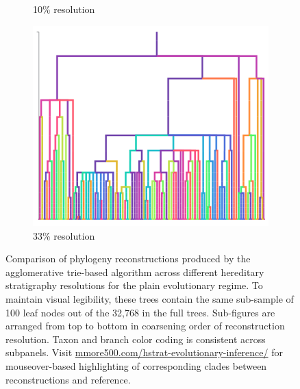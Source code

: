 \begin{figure}
\begin{subfigure}[b]{\linewidth}
    \caption{%
      10\% resolution}
    \label{fig:plain-perfect-and-reconstruction-phylogenies:resolution_10}
  \end{subfigure}
  \begin{subfigure}[b]{\linewidth}
    \centering
    \includegraphics[width=\textwidth, height=0.13\textheight]{img/plain_resolution_3} \caption{%
      33\% resolution}
    \label{fig:plain-perfect-and-reconstruction-phylogenies:resolution_3}
  \end{subfigure}
  \caption{%
    Comparison of phylogeny reconstructions produced by the agglomerative trie-based algorithm across different hereditary stratigraphy resolutions for the plain evolutionary regime.
    To maintain visual legibility, these trees contain the same sub-sample of 100 leaf nodes out of the 32,768 in the full trees.
    Sub-figures are arranged from top to bottom in coarsening order of reconstruction resolution.
    Taxon and branch color coding is consistent across subpanels.
    Visit \url{mmore500.com/hstrat-evolutionary-inference/} for mouseover-based highlighting of corresponding clades between reconstructions and reference.
  }
  \label{fig:plain-perfect-and-reconstruction-phylogenies}
\end{figure}
